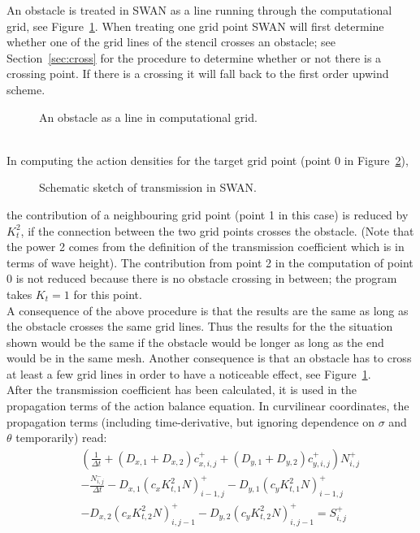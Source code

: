 \documentclass[12pt]{book}
\begin{document}
An obstacle is treated in SWAN as a line running through the computational grid, see Figure~\ref{fig:obsgrid}.
When treating one grid point SWAN will first determine whether one of the grid lines of the stencil
crosses an obstacle; see Section~\ref{sec:cross} for the procedure to determine whether or not there is a crossing point.
If there is a crossing it will fall back to the first order upwind scheme.
\begin{figure}[htb]
   \centerline{
              }
      \caption{An obstacle as a line in computational grid.}
      \label{fig:obsgrid}
\end{figure}
\\[2ex]
\noindent
In computing the action densities for the target grid point (point 0 in Figure~\ref{fig:stencil1}),
\begin{figure}[htb]
   \centerline{
              }
      \caption{Schematic sketch of transmission in SWAN.}
      \label{fig:stencil1}
\end{figure}
the contribution of a neighbouring grid point (point 1 in this case) is reduced by $K_t^2$,
if the connection between the two grid points crosses the obstacle.
(Note that the power 2 comes from the definition of the transmission coefficient which is
in terms of wave height).
The contribution from point 2 in the computation of point 0 is not reduced because there is no obstacle
crossing in between; the program takes $K_t=1$ for this point.
\\[2ex]
\noindent
A consequence of the above procedure is that the results are the same as long
as the obstacle crosses the same grid lines.
Thus the results for the the situation shown would be the same
if the obstacle would be longer as long as the end would be in the same mesh.
Another consequence is that an obstacle has to cross at least
a few grid lines in order to have a noticeable effect, see Figure~\ref{fig:obsgrid}.
\\[2ex]
\noindent
After the transmission coefficient has been calculated, it is used in
the propagation terms of the action balance equation.
In curvilinear coordinates, the propagation terms
(including time-derivative, but ignoring dependence on
$\sigma$ and $\theta$ temporarily) read:
\begin{eqnarray}
  && \left ( \frac{1}{\Delta t} + (D_{x,1} + D_{x,2})c_{x,i,j}^+ + (D_{y,1}+D_{y,2}) c_{y,i,j}^+ \right ) N_{i,j}^+ \nonumber \\
  && - \frac{N_{i,j}^-}{\Delta t} - D_{x,1} (c_x K^2_{t,1} N)_{i-1,j}^+ - D_{y,1} (c_y K^2_{t,1} N)_{i-1,j}^+ \nonumber \\
  && - D_{x,2} (c_x K^2_{t,2} N)_{i,j-1}^+ - D_{y,2} (c_y K^2_{t,2} N)_{i,j-1}^+ = S_{i,j}^+
\end{eqnarray}
\end{document}
